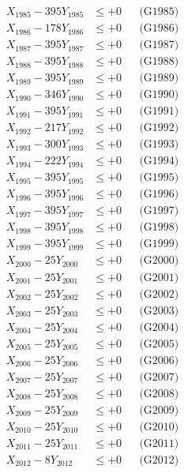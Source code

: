 \documentclass[a4paper,10pt]{article}
\begin{document}
{\begin{align}
X_{1985} - 395Y_{1985} &\leq +0 && \text{(G1985)} \\
X_{1986} - 178Y_{1986} &\leq +0 && \text{(G1986)} \\
X_{1987} - 395Y_{1987} &\leq +0 && \text{(G1987)} \\
X_{1988} - 395Y_{1988} &\leq +0 && \text{(G1988)} \\
X_{1989} - 395Y_{1989} &\leq +0 && \text{(G1989)} \\
X_{1990} - 346Y_{1990} &\leq +0 && \text{(G1990)} \\
\allowbreak
X_{1991} - 395Y_{1991} &\leq +0 && \text{(G1991)} \\
X_{1992} - 217Y_{1992} &\leq +0 && \text{(G1992)} \\
X_{1993} - 300Y_{1993} &\leq +0 && \text{(G1993)} \\
X_{1994} - 222Y_{1994} &\leq +0 && \text{(G1994)} \\
X_{1995} - 395Y_{1995} &\leq +0 && \text{(G1995)} \\
X_{1996} - 395Y_{1996} &\leq +0 && \text{(G1996)} \\
X_{1997} - 395Y_{1997} &\leq +0 && \text{(G1997)} \\
X_{1998} - 395Y_{1998} &\leq +0 && \text{(G1998)} \\
X_{1999} - 395Y_{1999} &\leq +0 && \text{(G1999)} \\
X_{2000} - 25Y_{2000} &\leq +0 && \text{(G2000)} \\
\allowbreak
X_{2001} - 25Y_{2001} &\leq +0 && \text{(G2001)} \\
X_{2002} - 25Y_{2002} &\leq +0 && \text{(G2002)} \\
X_{2003} - 25Y_{2003} &\leq +0 && \text{(G2003)} \\
X_{2004} - 25Y_{2004} &\leq +0 && \text{(G2004)} \\
X_{2005} - 25Y_{2005} &\leq +0 && \text{(G2005)} \\
X_{2006} - 25Y_{2006} &\leq +0 && \text{(G2006)} \\
X_{2007} - 25Y_{2007} &\leq +0 && \text{(G2007)} \\
X_{2008} - 25Y_{2008} &\leq +0 && \text{(G2008)} \\
X_{2009} - 25Y_{2009} &\leq +0 && \text{(G2009)} \\
X_{2010} - 25Y_{2010} &\leq +0 && \text{(G2010)} \\
\allowbreak
X_{2011} - 25Y_{2011} &\leq +0 && \text{(G2011)} \\
X_{2012} - 8Y_{2012} &\leq +0 && \text{(G2012)} \\

\end{align}}
\end{document}

